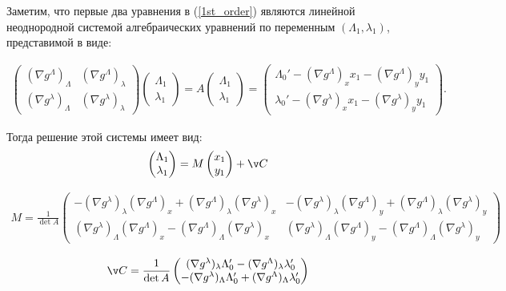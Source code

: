 \begin{enumerate}
Заметим, что первые два уравнения в (\ref{1st_order}) являются линейной неоднородной системой алгебраических уравнений по переменным $(\Lambda_1, \lambda_1)$, представимой в виде:

\begin{align*}
\begin{pmatrix}
(\nabla g^\Lambda)_\Lambda & (\nabla g^\Lambda)_\lambda \\
(\nabla g^\lambda)_\Lambda & (\nabla g^\lambda)_\lambda
\end{pmatrix}
\begin{pmatrix} \Lambda_1 \\ \lambda_1 \end{pmatrix}
= A \begin{pmatrix} \Lambda_1 \\ \lambda_1 \end{pmatrix} =
\begin{pmatrix} \Lambda_0' - (\nabla g^\Lambda)_x x_1 - (\nabla g^\Lambda)_y y_1 \\ \lambda_0' - (\nabla g^\lambda)_x x_1 - (\nabla g^\lambda)_y y_1 \end{pmatrix}.
\end{align*}

Тогда решение этой системы имеет вид:
\begin{align*}
    \begin{pmatrix} \Lambda_1 \\ \lambda_1 \end{pmatrix} = 
    M \begin{pmatrix} x_1 \\ y_1 \end{pmatrix} + \v C
\end{align*}

\begin{align*}
    M = \frac{1}{\det A} \begin{pmatrix} 
        -(\nabla g^\lambda)_\lambda (\nabla g^\Lambda)_x + (\nabla g^\Lambda)_\lambda (\nabla g^\lambda)_x & -(\nabla g^\lambda)_\lambda (\nabla g^\Lambda)_y + (\nabla g^\Lambda)_\lambda (\nabla g^\lambda)_y \\ 
         (\nabla g^\lambda)_\Lambda (\nabla g^\Lambda)_x - (\nabla g^\Lambda)_\Lambda (\nabla g^\lambda)_x &  (\nabla g^\lambda)_\Lambda (\nabla g^\Lambda)_y - (\nabla g^\Lambda)_\Lambda (\nabla g^\lambda)_y
    \end{pmatrix}
\end{align*}

$$\v C = \frac{1}{\det A} \begin{pmatrix} (\nabla g^\lambda)_\lambda \Lambda_0' - (\nabla g^\Lambda)_\lambda \lambda_0' \\ -(\nabla g^\lambda)_\Lambda \Lambda_0' + (\nabla g^\Lambda)_\Lambda \lambda_0' \end{pmatrix}$$


\end{enumerate}
